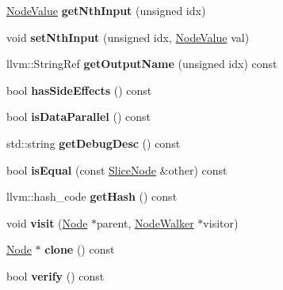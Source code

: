 \begin{DoxyCompactItemize}
\hyperlink{structglow_1_1_node_value}{Node\+Value} {\bfseries get\+Nth\+Input} (unsigned idx)
\item 
\mbox{\label{classglow_1_1_slice_node_a5784bb9f0a3fb477f88c15bdf1d7f9ea}} 
void {\bfseries set\+Nth\+Input} (unsigned idx, \hyperlink{structglow_1_1_node_value}{Node\+Value} val)
\item 
\mbox{\label{classglow_1_1_slice_node_a01ebf8235e3aad8de049e8f9640feed6}} 
llvm\+::\+String\+Ref {\bfseries get\+Output\+Name} (unsigned idx) const
\item 
\mbox{\label{classglow_1_1_slice_node_aa02b91d3532fcc378e085e84ccc838a3}} 
bool {\bfseries has\+Side\+Effects} () const
\item 
\mbox{\label{classglow_1_1_slice_node_a4c051458730861f19722831033d72a64}} 
bool {\bfseries is\+Data\+Parallel} () const
\item 
\mbox{\label{classglow_1_1_slice_node_a3b651109d9cb39ea4b621ae4b07a9a31}} 
std\+::string {\bfseries get\+Debug\+Desc} () const
\item 
\mbox{\label{classglow_1_1_slice_node_ac39435ca5b6c888bd0226736d0edbcbf}} 
bool {\bfseries is\+Equal} (const \hyperlink{classglow_1_1_slice_node}{Slice\+Node} \&other) const
\item 
\mbox{\label{classglow_1_1_slice_node_a90ac05588df84aa78689d52282578e35}} 
llvm\+::hash\+\_\+code {\bfseries get\+Hash} () const
\item 
\mbox{\label{classglow_1_1_slice_node_aa1eec48b8a35f2c07de311567fb906d0}} 
void {\bfseries visit} (\hyperlink{classglow_1_1_node}{Node} $\ast$parent, \hyperlink{classglow_1_1_node_walker}{Node\+Walker} $\ast$visitor)
\item 
\mbox{\label{classglow_1_1_slice_node_a9a3ef28862abe16fca375337cd2f19a7}} 
\hyperlink{classglow_1_1_node}{Node} $\ast$ {\bfseries clone} () const
\item 
\mbox{\label{classglow_1_1_slice_node_a34c9a542c9f46070de2502b8fc03ca0b}} 
bool {\bfseries verify} () const
\end{DoxyCompactItemize}
